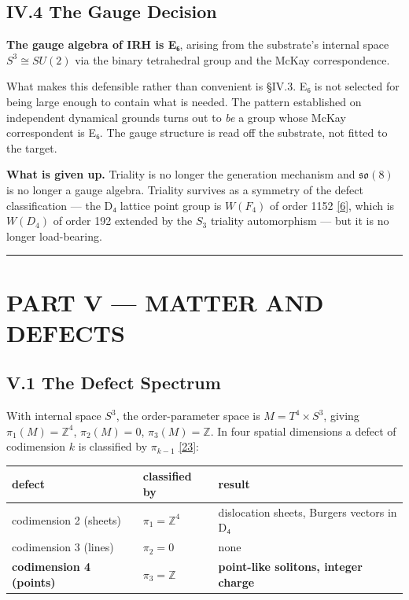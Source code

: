 \documentclass[a4paper,11pt]{article}
\begin{document}
\subsection*{IV.4 The Gauge Decision}

\textbf{The gauge algebra of IRH is E₆}, arising from the substrate's internal space $S^3\cong SU(2)$ via the binary tetrahedral group and the McKay correspondence.

What makes this defensible rather than convenient is §IV.3. E₆ is not selected for being large enough to contain what is needed. The pattern established on independent dynamical grounds turns out to \textit{be} a group whose McKay correspondent is E₆. The gauge structure is read off the substrate, not fitted to the target.

\textbf{What is given up.} Triality is no longer the generation mechanism and $\mathfrak{so}(8)$ is no longer a gauge algebra. Triality survives as a symmetry of the defect classification — the D₄ lattice point group is $W(F_4)$ of order 1152 \hyperref[ref6]{[6]}, which is $W(D_4)$ of order 192 extended by the $S_3$ triality automorphism — but it is no longer load-bearing.

\medskip\hrule\medskip

\section*{PART V — MATTER AND DEFECTS}

\subsection*{V.1 The Defect Spectrum}

With internal space $S^3$, the order-parameter space is $M=T^4\times S^3$, giving $\pi_1(M)=\mathbb{Z}^4$, $\pi_2(M)=0$, $\pi_3(M)=\mathbb{Z}$. In four spatial dimensions a defect of codimension $k$ is classified by $\pi_{k-1}$ \hyperref[ref23]{[23]}:

\begin{center}
\begin{tabular}{lll}
\hline
defect & classified by & result \\
\hline
codimension 2 (sheets) & $\pi_1=\mathbb{Z}^4$ & dislocation sheets, Burgers vectors in D₄ \\
codimension 3 (lines) & $\pi_2=0$ & none \\
\textbf{codimension 4 (points)} & $\pi_3=\mathbb{Z}$ & \textbf{point-like solitons, integer charge} \\
\hline
\end{tabular}
\end{center}
\end{document}
